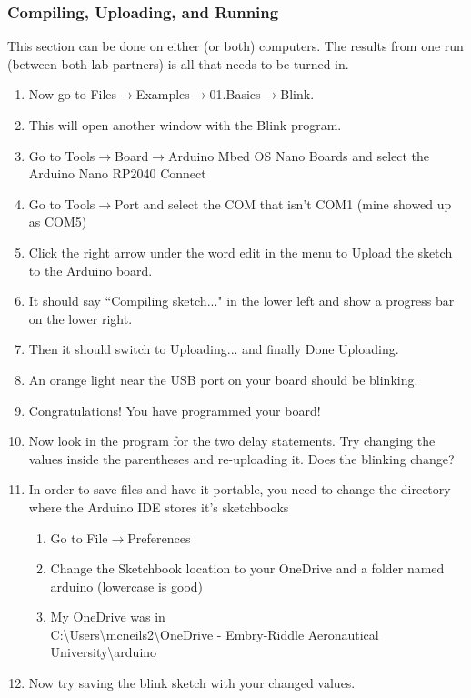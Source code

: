 \subsubsection{Compiling, Uploading, and Running}
This section can be done on either (or both) computers. The results from one run (between both lab partners)
is all that needs to be turned in.
\begin{enumerate}
	\item Now go to Files$\rightarrow$Examples$\rightarrow$01.Basics$\rightarrow$Blink.
	\item This will open another window with the Blink program.
	\item Go to Tools$\rightarrow$Board$\rightarrow$Arduino Mbed OS Nano Boards and select the Arduino Nano RP2040 Connect
	\item Go to Tools$\rightarrow$Port and select the COM that isn't COM1 (mine showed up as COM5)
	\item Click the right arrow under the word edit in the menu to Upload the sketch to the Arduino board.
	\item It should say ``Compiling sketch..." in the lower left and show a progress bar on the lower right.
	\item Then it should switch to Uploading... and finally Done Uploading.
	\item An orange light near the USB port on your board should be blinking.
	\item Congratulations! You have programmed your board!
	\item Now look in the program for the two delay statements. Try changing the values inside the parentheses and re-uploading it. Does the blinking change?
	\item In order to save files and have it portable, you need to change the directory where the Arduino IDE stores it's sketchbooks
	\begin{enumerate}
		\item Go to File$\rightarrow$Preferences
		\item Change the Sketchbook location to your OneDrive and a folder named arduino (lowercase is good)
		\item My OneDrive was in \\C:\textbackslash Users\textbackslash mcneils2\textbackslash OneDrive - Embry-Riddle 
		Aeronautical University\textbackslash arduino
	\end{enumerate}
	\item Now try saving the blink sketch with your changed values.

\end{enumerate}
